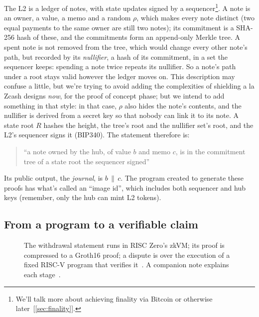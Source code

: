 \documentclass[11pt]{article}
\begin{document}
The L2 is a ledger of notes, with state updates signed by a sequencer\footnote{We'll talk more about achieving finality via Bitcoin or otherwise later~[\ref{sec:finality}].}. A note is an owner, a value, a memo and a
random $\rho$, which makes every note distinct (two equal payments to the
same owner are still two notes); its commitment is a SHA-256 hash of
these, and the commitments form an append-only Merkle tree. A spent note
is not removed from the tree, which would change every other note's
path, but recorded by its \emph{nullifier}, a hash of its commitment, in
a set the sequencer keeps: spending a note twice repeats its nullifier.
So a note's path under a root stays valid however the ledger moves on.
This description may confuse a little, but we're trying to avoid adding the complexities of shielding a la Zcash designs \emph{now}, for the proof of concept phase; but we intend to add something in that style: in that case, $\rho$
also hides the note's contents, and the nullifier is derived from a
secret key so that nobody can link it to its note. A
state root $R$ hashes the height, the tree's root and the nullifier
set's root, and the L2's sequencer signs it (BIP340). The statement therefore is:
\begin{quote}
``a note owned by the hub, of value $b$ and memo $c$, is in the
commitment tree of a state root the sequencer signed''
\end{quote}
Its public output, the \emph{journal}, is $b \,\|\, c$. The program created to generate these proofs has what's called an ``image id'', which includes both sequencer and hub keys (remember, only the hub can mint L2 tokens).

\subsection{From a program to a verifiable claim}

\begin{figure}[H]
\centering
{}
\caption{The withdrawal statement runs in RISC Zero's zkVM; its proof is
compressed to a Groth16 proof; a dispute is over the execution of a fixed
RISC-V program that verifies it~\cite{risc0,bitvmx}. A companion note
explains each stage~\cite{pipeline}.}
\end{figure}
\end{document}
